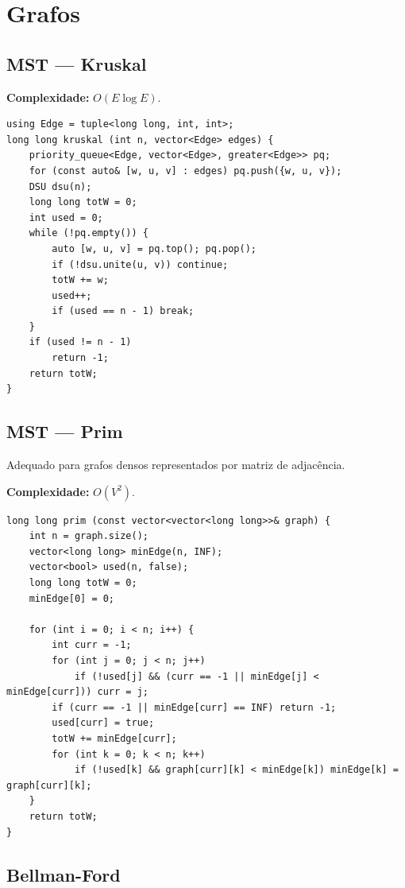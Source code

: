 \section{Grafos}



\subsection{MST --- Kruskal}

\textbf{Complexidade:} $O(E\log E)$.

\begin{lstlisting}
using Edge = tuple<long long, int, int>;
long long kruskal (int n, vector<Edge> edges) {
    priority_queue<Edge, vector<Edge>, greater<Edge>> pq;
    for (const auto& [w, u, v] : edges) pq.push({w, u, v});
    DSU dsu(n);
    long long totW = 0;
    int used = 0;
    while (!pq.empty()) {
        auto [w, u, v] = pq.top(); pq.pop();
        if (!dsu.unite(u, v)) continue;
        totW += w;
        used++;
        if (used == n - 1) break;
    }
    if (used != n - 1)
        return -1;
    return totW;
}
\end{lstlisting}


\subsection{MST --- Prim}

Adequado para grafos densos representados por matriz de adjacência.

\textbf{Complexidade:} $O(V^2)$.

\begin{lstlisting}
long long prim (const vector<vector<long long>>& graph) {
    int n = graph.size();
    vector<long long> minEdge(n, INF);
    vector<bool> used(n, false);
    long long totW = 0;
    minEdge[0] = 0;

    for (int i = 0; i < n; i++) {
        int curr = -1;
        for (int j = 0; j < n; j++)
            if (!used[j] && (curr == -1 || minEdge[j] < minEdge[curr])) curr = j;
        if (curr == -1 || minEdge[curr] == INF) return -1;
        used[curr] = true;
        totW += minEdge[curr];
        for (int k = 0; k < n; k++)
            if (!used[k] && graph[curr][k] < minEdge[k]) minEdge[k] = graph[curr][k];
    }
    return totW;
}
\end{lstlisting}



\subsection{Bellman-Ford}

